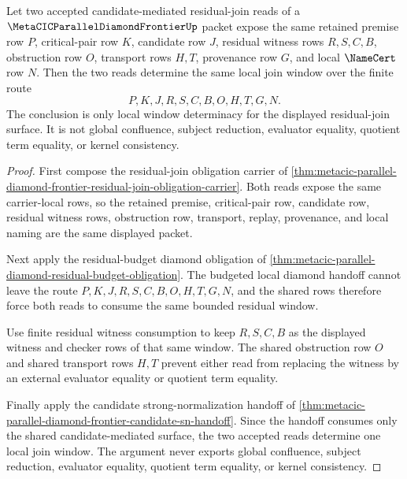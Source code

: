\begin{theorem}
\label{thm:metacic-parallel-diamond-frontier-residual-join-window-determinacy}
Let two accepted candidate-mediated residual-join reads of a $\MetaCICParallelDiamondFrontierUp$ packet expose the same retained premise row $P$, critical-pair row $K$, candidate row $J$, residual witness rows $R,S,C,B$, obstruction row $O$, transport rows $H,T$, provenance row $G$, and local $\NameCert$ row $N$. Then the two reads determine the same local join window over the finite route
$$
P,K,J,R,S,C,B,O,H,T,G,N .
$$
The conclusion is only local window determinacy for the displayed residual-join surface. It is not global confluence, subject reduction, evaluator equality, quotient term equality, or kernel consistency.
\end{theorem}
\begin{proof}
First compose the residual-join obligation carrier of \autoref{thm:metacic-parallel-diamond-frontier-residual-join-obligation-carrier}. Both reads expose the same carrier-local rows, so the retained premise, critical-pair row, candidate row, residual witness rows, obstruction row, transport, replay, provenance, and local naming are the same displayed packet.

Next apply the residual-budget diamond obligation of \autoref{thm:metacic-parallel-diamond-residual-budget-obligation}. The budgeted local diamond handoff cannot leave the route $P,K,J,R,S,C,B,O,H,T,G,N$, and the shared rows therefore force both reads to consume the same bounded residual window.

Use finite residual witness consumption to keep $R,S,C,B$ as the displayed witness and checker rows of that same window. The shared obstruction row $O$ and shared transport rows $H,T$ prevent either read from replacing the witness by an external evaluator equality or quotient term equality.

Finally apply the candidate strong-normalization handoff of \autoref{thm:metacic-parallel-diamond-frontier-candidate-sn-handoff}. Since the handoff consumes only the shared candidate-mediated surface, the two accepted reads determine one local join window. The argument never exports global confluence, subject reduction, evaluator equality, quotient term equality, or kernel consistency.
\end{proof}
